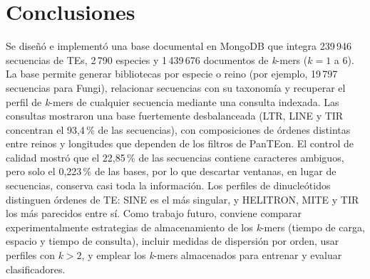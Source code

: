 \section{Conclusiones}
Se diseñó e implementó una base documental en MongoDB que integra
239\,946 secuencias de TEs, 2\,790 especies y 1\,439\,676 documentos de
\textit{k}-mers ($k=1$ a $6$). La base permite generar bibliotecas por
especie o reino (por ejemplo, 19\,797 secuencias para Fungi), relacionar
secuencias con su taxonomía y recuperar el perfil de \textit{k}-mers de
cualquier secuencia mediante una consulta indexada. Las consultas
mostraron una base fuertemente desbalanceada (LTR, LINE y TIR concentran
el 93,4\,\% de las secuencias), con composiciones de órdenes distintas
entre reinos y longitudes que dependen de los filtros de PanTEon. El
control de calidad mostró que el 22,85\,\% de las secuencias contiene
caracteres ambiguos, pero solo el 0,223\,\% de las bases, por lo que
descartar ventanas, en lugar de secuencias, conserva casi toda la
información. Los perfiles de dinucleótidos distinguen órdenes de TE:
SINE es el más singular, y HELITRON, MITE y TIR los más parecidos entre
sí. Como trabajo futuro, conviene comparar experimentalmente
estrategias de almacenamiento de los \textit{k}-mers (tiempo de carga,
espacio y tiempo de consulta), incluir medidas de dispersión por orden,
usar perfiles con $k>2$, y emplear los \textit{k}-mers almacenados para
entrenar y evaluar clasificadores.